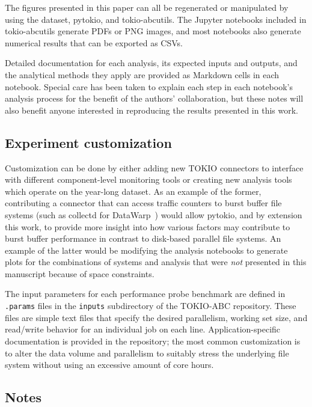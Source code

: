 The figures presented in this paper can all be regenerated or manipulated by using the dataset, pytokio, and tokio-abcutils.
The Jupyter notebooks included in tokio-abcutils generate PDFs or PNG images, and most notebooks also generate numerical results that can be exported as CSVs.

Detailed documentation for each analysis, its expected inputs and outputs, and the analytical methods they apply are provided as Markdown cells in each notebook.
Special care has been taken to explain each step in each notebook's analysis process for the benefit of the authors' collaboration, but these notes will also benefit anyone interested in reproducing the results presented in this work.

\subsection{Experiment customization}

Customization can be done by either adding new TOKIO connectors to interface with different component-level monitoring tools or creating new analysis tools which operate on the year-long dataset.
As an example of the former, contributing a connector that can access traffic counters to burst buffer file systems (such as collectd for DataWarp~\cite{Lockwood2018tokio}) would allow pytokio, and by extension this work, to provide more insight into how various factors may contribute to burst buffer performance in contrast to disk-based parallel file systems.
An example of the latter would be modifying the analysis notebooks to generate plots for the combinations of systems and analysis that were \emph{not} presented in this manuscript because of space constraints.

The input parameters for each performance probe benchmark are defined in \texttt{.params} files in the \texttt{inputs} subdirectory of the TOKIO-ABC repository.
These files are simple text files that specify the desired parallelism, working set size, and read/write behavior for an individual job on each line.
Application-specific documentation is provided in the repository; the most common customization is to alter the data volume and parallelism to suitably stress the underlying file system without using an excessive amount of core hours.

\subsection{Notes}

